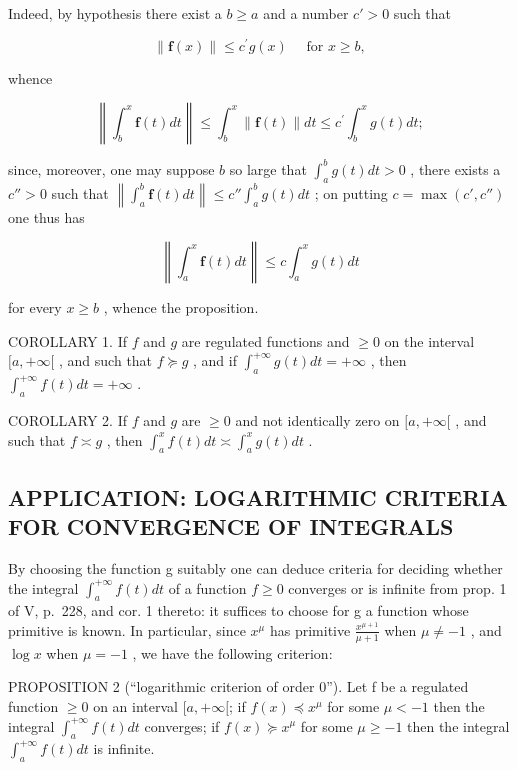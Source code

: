 Indeed, by hypothesis there exist a \(b \geqslant a\) and a number \(c' > 0\) such that

\[
\| \mathbf {f} (x) \| \leqslant c ^ {\prime} g (x) \quad \text {   for   } x \geqslant b,
\]

whence

\[
\left\| \int_ {b} ^ {x} \mathbf {f} (t) d t \right\| \leqslant \int_ {b} ^ {x} \| \mathbf {f} (t) \| d t \leqslant c ^ {\prime} \int_ {b} ^ {x} g (t) d t;
\]

since, moreover, one may suppose \(b\) so large that \(\int_{a}^{b} g(t) dt > 0\) , there exists a \(c'' > 0\) such that \(\left\| \int_{a}^{b} \mathbf{f}(t) dt \right\| \leqslant c'' \int_{a}^{b} g(t) dt\) ; on putting \(c = \max(c', c'')\) one thus has

\[
\left\| \int_ {a} ^ {x} \mathbf {f} (t) d t \right\| \leqslant c \int_ {a} ^ {x} g (t) d t
\]

for every \(x \geqslant b\) , whence the proposition.

COROLLARY 1. If \(f\) and \(g\) are regulated functions and \(\geqslant 0\) on the interval \([a, +\infty[\) , and such that \(f \succcurlyeq g\) , and if \(\int_{a}^{+\infty} g(t) dt = +\infty\) , then \(\int_{a}^{+\infty} f(t) dt = +\infty\) .

COROLLARY 2. If \(f\) and \(g\) are \(\geqslant 0\) and not identically zero on \([a, +\infty[\) , and such that \(f \asymp g\) , then \(\int_{a}^{x} f(t) dt \asymp \int_{a}^{x} g(t) dt\) .

\subsection{APPLICATION: LOGARITHMIC CRITERIA FOR CONVERGENCE OF INTEGRALS}

By choosing the function g suitably one can deduce criteria for deciding whether the integral \(\int_{a}^{+\infty} f(t) dt\) of a function \(f \geqslant 0\) converges or is infinite from prop. 1 of V, p.~228, and cor. 1 thereto: it suffices to choose for g a function whose primitive is known. In particular, since \(x^{\mu}\) has primitive \(\frac{x^{\mu+1}}{\mu+1}\) when \(\mu \neq -1\) , and \(\log x\) when \(\mu = -1\) , we have the following criterion:

PROPOSITION 2 (``logarithmic criterion of order 0''). Let f be a regulated function \(\geqslant 0\) on an interval \([a, +\infty[\); if \(f(x) \preccurlyeq x^{\mu}\) for some \(\mu < -1\) then the integral \(\int_{a}^{+\infty} f(t) dt\) converges; if \(f(x) \succcurlyeq x^{\mu}\) for some \(\mu \geqslant -1\) then the integral \(\int_{a}^{+\infty} f(t) dt\) is infinite.

